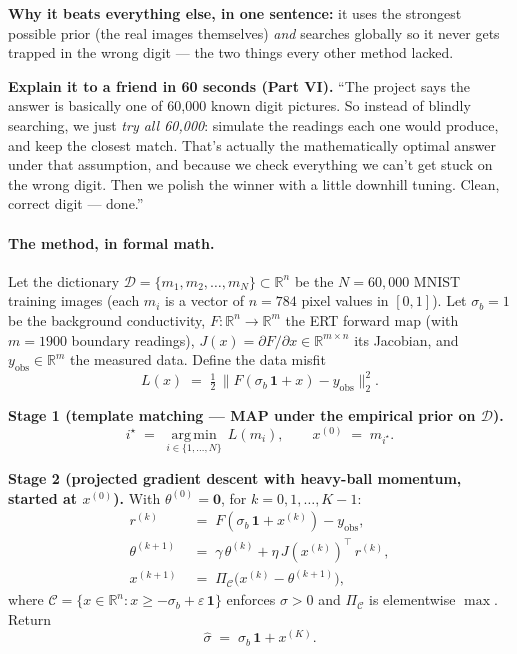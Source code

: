 \documentclass[11pt]{article}
\begin{document}
\textbf{Why it beats everything else, in one sentence:} it uses the strongest
possible prior (the real images themselves) \emph{and} searches globally so it
never gets trapped in the wrong digit --- the two things every other method
lacked.

\begin{intuition}
\textbf{Explain it to a friend in 60 seconds (Part VI).} ``The project says the
answer is basically one of 60{,}000 known digit pictures. So instead of
blindly searching, we just \emph{try all 60{,}000}: simulate the readings each
one would produce, and keep the closest match. That's actually the
mathematically optimal answer under that assumption, and because we check
everything we can't get stuck on the wrong digit. Then we polish the winner
with a little downhill tuning. Clean, correct digit --- done.''
\end{intuition}

\paragraph{The method, in formal math.}
Let the dictionary $\mathcal{D} = \{m_1, m_2, \ldots, m_N\} \subset \mathbb{R}^n$
be the $N = 60{,}000$ MNIST training images (each $m_i$ is a vector of
$n = 784$ pixel values in $[0,1]$). Let $\sigma_b = 1$ be the background
conductivity, $F : \mathbb{R}^n \to \mathbb{R}^m$ the ERT forward map (with
$m = 1900$ boundary readings), $J(x) = \partial F / \partial x \in
\mathbb{R}^{m \times n}$ its Jacobian, and $y_{\text{obs}} \in \mathbb{R}^m$
the measured data. Define the data misfit
\[
L(x) \;=\; \tfrac{1}{2}\, \bigl\| F(\sigma_b\,\mathbf{1} + x) - y_{\text{obs}} \bigr\|_2^2 .
\]

\smallskip
\noindent\textbf{Stage 1 (template matching --- MAP under the empirical prior on $\mathcal{D}$).}
\[
i^{\star} \;=\; \operatorname*{arg\,min}_{i \in \{1, \ldots, N\}} \, L(m_i),
\qquad x^{(0)} \;=\; m_{i^{\star}} .
\]

\smallskip
\noindent\textbf{Stage 2 (projected gradient descent with heavy-ball momentum, started at $x^{(0)}$).}
With $\theta^{(0)} = \mathbf{0}$, for $k = 0, 1, \ldots, K-1$:
\begin{align*}
r^{(k)}         \;&=\; F(\sigma_b\,\mathbf{1} + x^{(k)}) - y_{\text{obs}}, \\
\theta^{(k+1)}  \;&=\; \gamma\,\theta^{(k)} + \eta\, J(x^{(k)})^{\top}\, r^{(k)}, \\
x^{(k+1)}       \;&=\; \Pi_{\mathcal{C}}\!\bigl( x^{(k)} - \theta^{(k+1)} \bigr),
\end{align*}
where $\mathcal{C} = \{x \in \mathbb{R}^n : x \geq -\sigma_b + \varepsilon\,\mathbf{1}\}$
enforces $\sigma > 0$ and $\Pi_{\mathcal{C}}$ is elementwise $\max$. Return
\[
\hat{\sigma} \;=\; \sigma_b\,\mathbf{1} + x^{(K)} .
\]
\end{document}

